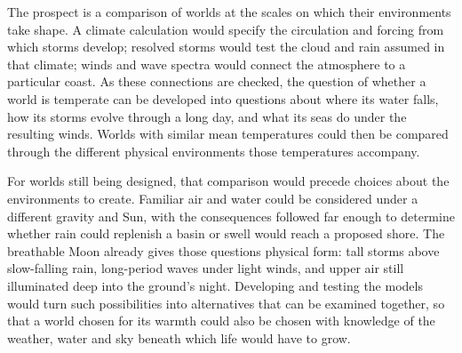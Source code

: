 The prospect is a comparison of worlds at the scales on which their environments take shape. A climate
calculation would specify the circulation and forcing from which storms develop; resolved storms would test
the cloud and rain assumed in that climate; winds and wave spectra would connect the atmosphere to a
particular coast. As these connections are checked, the question of whether a world is temperate can be
developed into questions about where its water falls, how its storms evolve through a long day, and what its
seas do under the resulting winds. Worlds with similar mean temperatures could then be compared through the
different physical environments those temperatures accompany.

For worlds still being designed, that comparison would precede choices about the environments to create.
Familiar air and water could be considered under a different gravity and Sun, with the consequences followed
far enough to determine whether rain could replenish a basin or swell would reach a proposed shore. The
breathable Moon already gives those questions physical form: tall storms above slow-falling rain, long-period
waves under light winds, and upper air still illuminated deep into the ground's night. Developing and testing
the models would turn such possibilities into alternatives that can be examined together, so that a world
chosen for its warmth could also be chosen with knowledge of the weather, water and sky beneath which life
would have to grow.
